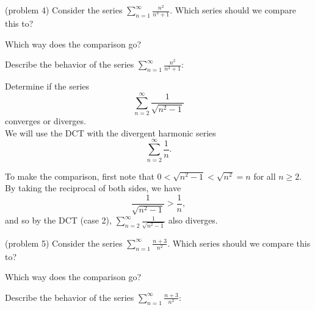 \documentclass{ximera}
\begin{document}
\begin{problem}(problem 4)
Consider the series $\displaystyle{\sum_{n=1}^\infty \frac{n^2}{n^3 + 1}}$.
Which series should we compare this to?

\begin{multipleChoice}
\end{multipleChoice}

Which way does the comparison go?
\begin{multipleChoice}
\end{multipleChoice}

Describe the behavior of the series $\sum_{n=1}^\infty \frac{n^2}{n^3 + 1}:$
\begin{multipleChoice}
\end{multipleChoice}

\end{problem}



\begin{example}[example 5]
Determine if the series 
\[
\sum_{n=2}^\infty \frac{1}{\sqrt{n^2 -1}}
\]
 converges or diverges.\\
We will use the DCT with the divergent harmonic series 
\[
\sum_{n=2}^\infty \frac{1}{n}.
\]

To make the comparison, first note that $0 < \sqrt{n^2 -1} < \sqrt{n^2} = n$ for all $n \geq 2$. By taking the reciprocal of both sides,
we have 
\[
\frac{1}{\sqrt{n^2 -1}} > \frac{1}{n},
\]
and so by the DCT (case 2), $\sum_{n=2}^\infty \frac{1}{\sqrt{n^2 -1}}$ also diverges.
\end{example}


\begin{problem}(problem 5)
Consider the series $\displaystyle{\sum_{n=1}^\infty \frac{n+3}{n^2}}$.
Which series should we compare this to?

\begin{multipleChoice}
\end{multipleChoice}

Which way does the comparison go?
\begin{multipleChoice}
\end{multipleChoice}

Describe the behavior of the series $\sum_{n=1}^\infty \frac{n+3}{n^2}:$
\begin{multipleChoice}
\end{multipleChoice}

\end{problem}
\end{document}

